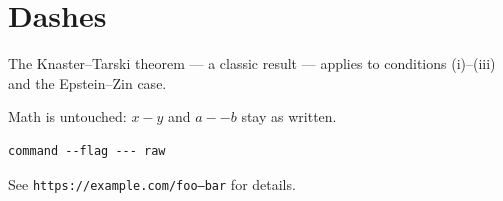 \section{Dashes}

The Knaster--Tarski theorem --- a classic result --- applies to
conditions (i)--(iii) and the Epstein--Zin case.

Math is untouched: $x - y$ and $a--b$ stay as written.

\begin{verbatim}
command --flag --- raw
\end{verbatim}

See \texttt{https://example.com/foo--bar} for details.
